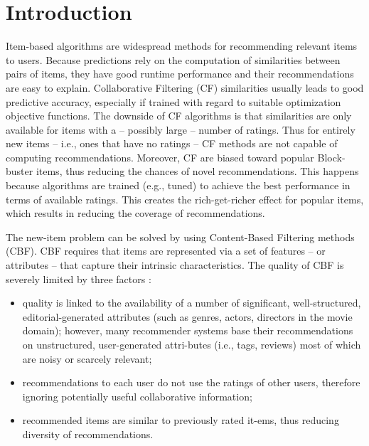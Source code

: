 \documentclass{sig-alternate}
\begin{document}
\section{Introduction}

Item-based algorithms are widespread methods for recommending
relevant items to users. Because predictions rely on the
computation of similarities between pairs of items, they have good
runtime performance and their recommendations are easy to explain.
Collaborative Filtering (CF) similarities usually leads to good
predictive accuracy, especially if trained with regard to suitable optimization
objective functions. The downside of CF algorithms
is that similarities are only available for items with a – possibly
large – number of ratings. Thus for entirely new items – i.e., ones
that have no ratings – CF methods are not capable of computing
recommendations. Moreover, CF are biased toward popular Block-
buster items, thus reducing the chances of novel recommendations.
This happens because algorithms are trained (e.g., tuned) to achieve
the best performance in terms of available ratings. This creates the
rich-get-richer effect for popular items, which results in reducing
the coverage of recommendations.


The new-item problem can be solved by using Content-Based
Filtering methods (CBF). CBF requires that items are represented
via a set of features – or attributes – that capture their intrinsic
characteristics. The quality of CBF is severely limited by three
factors \cite{4}:

\begin{itemize}
\item quality is linked to the availability of a number of significant,
well-structured, editorial-generated attributes (such
as genres, actors, directors in the movie domain); however,
many recommender systems base their recommendations
on unstructured, user-generated attri-butes (i.e., tags, reviews)
most of which are noisy or scarcely relevant;
\end{itemize}

\begin{itemize}
\item recommendations to each user do not use the ratings of
other users, therefore ignoring potentially useful collaborative
information;
\end{itemize}

\begin{itemize}
\item recommended items are similar to previously rated 
it-ems,
thus reducing diversity of recommendations.
\end{itemize}
\end{document}
